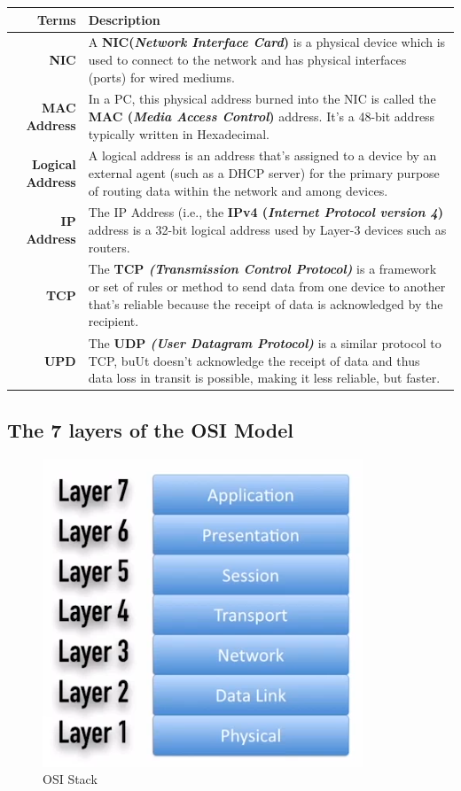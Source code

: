 \noindent
\begin{tabular}{rM{0.75}}
	\toprule
	\textbf{Terms} &\textbf{Description} \\
	\midrule
	\textbf{NIC}	&A \textbf{NIC(\textit{Network Interface Card})} is a physical device which is used to connect to the network and has physical interfaces (ports) for wired mediums. \\
	\midrule
	\textbf{MAC Address}	&In a PC, this physical address burned into the NIC is called the \textbf{MAC (\textit{Media Access Control})} address. It's a 48-bit address typically written in Hexadecimal.\\
	\midrule
	\textbf{Logical Address}	&A logical address is an address that's assigned to a device by an external agent (such as a DHCP server) for the primary purpose of routing data within the network and among devices.\\
	\midrule
	\textbf{IP Address}	&The IP Address (i.e., the \textbf{IPv4 (\textit{Internet Protocol version 4})} address is a 32-bit logical address used by Layer-3 devices such as routers.\\
	\midrule
	\textbf{TCP}	&The \textbf{TCP \textit{(Transmission Control Protocol)}} is a framework or set of rules or method to send data from one device to another that's reliable because the receipt of data is acknowledged by the recipient.\\
	\midrule
	\textbf{UPD}	&The \textbf{UDP \textit{(User Datagram Protocol)}} is a similar protocol to TCP, buUt doesn't acknowledge the receipt of data and thus data loss in transit is possible, making it less reliable, but faster. \\
	\bottomrule
\end{tabular}

\subsection{The 7 layers of the OSI Model}

\begin{figure}[H]
	\centering
	\includegraphics[width=0.5\linewidth]{"Mod1/chapters/1.1.a OSI Stack"}
	\caption{OSI Stack}
	\label{fig:1 OSI Stack}
\end{figure}

